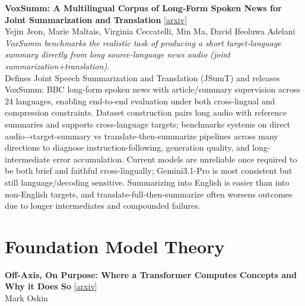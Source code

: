 \documentclass[12pt,letterpaper]{article}
\begin{document}
\medskip

{\small\textbf{VoxSumm: A Multilingual Corpus of Long-Form Spoken News for Joint Summarization and Translation}} {\scriptsize[\href{https://arxiv.org/abs/2608.10359}{arxiv}]}\\
{\scriptsize Yejin Jeon, Marie Maltais, Virginia Ceccatelli, Min Ma, David Ifeoluwa Adelani}\\

{\small\textit{VoxSumm benchmarks the realistic task of producing a short target-language summary directly from long source-language news audio (joint summarization+translation).}}\\[1pt]
{\footnotesize Defines Joint Speech Summarization and Translation (JSumT) and releases VoxSumm: BBC long-form spoken news with article/summary supervision across 24 languages, enabling end-to-end evaluation under both cross-lingual and compression constraints. Dataset construction pairs long audio with reference summaries and supports cross-language targets; benchmarks systems on direct audio→target-summary vs translate-then-summarize pipelines across many directions to diagnose instruction-following, generation quality, and long-intermediate error accumulation. Current models are unreliable once required to be both brief and faithful cross-lingually; Gemini3.1-Pro is most consistent but still language/decoding sensitive. Summarizing into English is easier than into non-English targets, and translate-full-then-summarize often worsens outcomes due to longer intermediates and compounded failures.}

\medskip


\section*{Foundation Model Theory}

{\small\textbf{Off-Axis, On Purpose: Where a Transformer Computes Concepts and Why it Does So}} {\scriptsize[\href{https://arxiv.org/abs/2608.10251}{arxiv}]}\\
{\scriptsize Mark Oskin}\\
\end{document}
